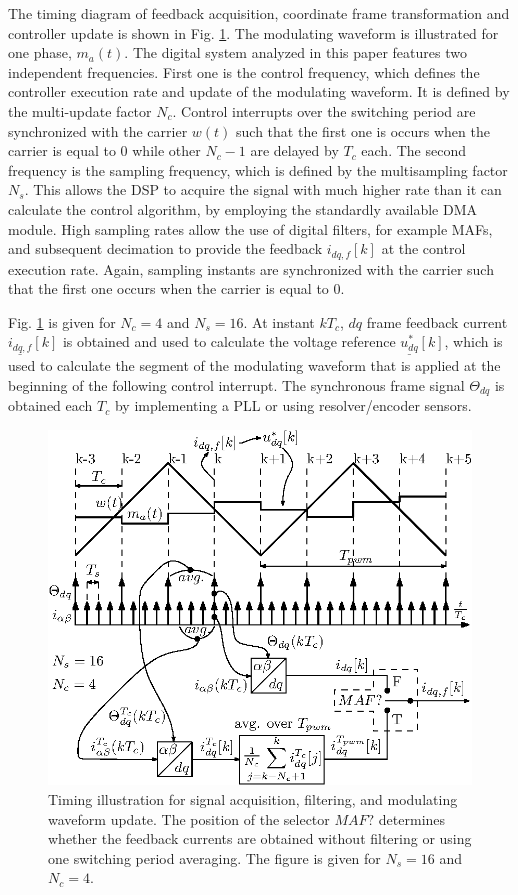 \documentclass[conference]{IEEEtran}
\begin{document}
The timing diagram of feedback acquisition, coordinate frame transformation and controller update is shown in Fig. \ref{fig:timings}. The modulating waveform is illustrated for one phase, $m_a(t)$.
The digital system analyzed in this paper features two independent frequencies. First one is the control frequency, which defines the controller execution rate and update of the modulating waveform. It is defined by the multi-update factor $N_c$. Control interrupts over the switching period are synchronized with the carrier $w(t)$ such that the first one is occurs when the carrier is equal to $0$ while other $N_c-1$ are delayed by $T_c$ each. 
The second frequency is the sampling frequency, which is defined by the multisampling factor $N_s$. This allows the DSP to acquire the signal with much higher rate than it can calculate the control algorithm, by employing the standardly available DMA module. High sampling rates allow the use of digital filters, for example MAFs, and subsequent decimation to provide the feedback $i_{dq,f}[k]$ at the control execution rate.
Again, sampling instants are synchronized with the carrier such that the first one occurs when the carrier is equal to $0$. 

Fig. \ref{fig:timings} is given for $N_c = 4$ and $N_s = 16$. At instant $kT_c$, $dq$ frame feedback current $\underline{i_{dq,f}}[k]$ is obtained and used to calculate the voltage reference $\underline{u^*_{dq}}[k]$, which is used to calculate the segment of the modulating waveform that is applied at the beginning of the following control interrupt. The synchronous frame signal $\Theta_{dq}$ is obtained each $T_c$ by implementing a PLL or using resolver/encoder sensors. 

\begin{figure}[t!]
    \centerline{\includegraphics[width=0.95\linewidth]{figures/timing_diagram.eps}}
    \caption{Timing illustration for signal acquisition, filtering, and modulating waveform update. The position of the selector $MAF?$ determines whether the feedback currents are obtained without filtering or using one switching period averaging. The figure is given for $N_s = 16$ and $N_c = 4$.}
    \label{fig:timings}
\end{figure}
\end{document}
